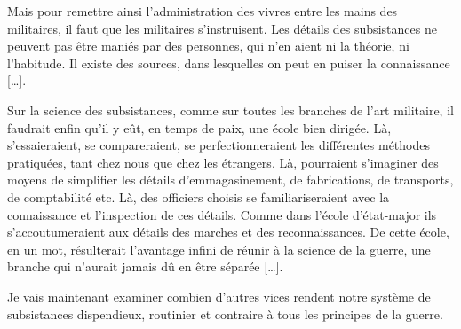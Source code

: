 \documentclass[french,twoside]{book} %
\begin{document}
Mais pour remettre ainsi l’administration des vivres entre les mains des militaires, il faut que les militaires s’instruisent. Les détails des subsistances ne peuvent pas être maniés par des personnes, qui n’en aient ni la théorie, ni l’habitude. Il existe des sources, dans lesquelles on peut en puiser la connaissance […].\par
Sur la science des subsistances, comme sur toutes les branches de l’art militaire, il faudrait enfin qu’il y eût, en temps de paix, une école bien dirigée. Là, s’essaieraient, se compareraient, se perfectionneraient les différentes méthodes pratiquées, tant chez nous que chez les étrangers. Là, pourraient s’imaginer des moyens de simplifier les détails d’emmagasinement, de fabrications, de transports, de comptabilité etc. Là, des officiers choisis se familiariseraient avec la connaissance et l’inspection de ces détails. Comme dans l’école d’état-major ils s’accoutumeraient aux détails des marches et des reconnaissances. De cette école, en un mot, résulterait l’avantage infini de réunir à la science de la guerre, une branche qui n’aurait jamais dû en être séparée […].\par
Je vais maintenant examiner combien d’autres vices rendent notre système de subsistances dispendieux, routinier et contraire à tous les principes de la guerre.\par
\end{document}
